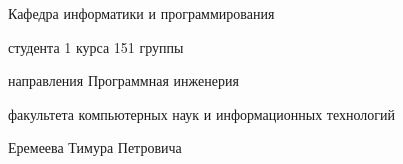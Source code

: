 



\begin{flushright}
    Кафедра информатики и программирования
\end{flushright}



\begin{flushleft}
студента 1 курса 151 группы

направления Программная инженерия

факультета компьютерных наук и информационных технологий

Еремеева Тимура Петровича
\end{flushleft}



\clearpage
